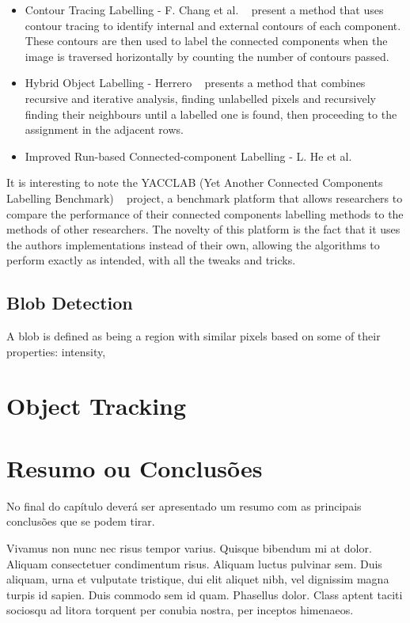 \begin{itemize}
	\item Contour Tracing Labelling - F. Chang et al. ~\cite{chang_linear-time_2004} present a method that uses contour tracing to identify internal and external contours of each component. These contours are then used to label the connected components when the image is traversed horizontally by counting the number of contours passed.
	\item Hybrid Object Labelling - Herrero ~\cite{martin-herrero_hybrid_2007} presents a method that combines recursive and iterative analysis, finding unlabelled pixels and recursively finding their neighbours until a labelled one is found, then proceeding to the assignment in the adjacent rows.
	\item Improved Run-based Connected-component Labelling - L. He et al. ~\cite{he_run-based_2010}
\end{itemize}


It is interesting to note the YACCLAB (Yet Another Connected Components Labelling Benchmark) ~\cite{grana_yacclab_2016} project, a benchmark platform that allows researchers to compare the performance of their connected components labelling methods to the methods of other researchers. The novelty of this platform is the fact that it uses the authors implementations instead of their own, allowing the algorithms to perform exactly as intended, with all the tweaks and tricks.

\subsection{Blob Detection}

A blob is defined as being a region with similar pixels based on some of their properties: intensity, 

\section{Object Tracking}



\section{Resumo ou Conclusões}

No final do capítulo deverá ser apresentado um resumo com as 
principais conclusões que se podem tirar. 

Vivamus non nunc nec risus tempor varius. Quisque bibendum mi at
dolor. Aliquam consectetuer condimentum risus. Aliquam luctus pulvinar
sem. Duis aliquam, urna et vulputate tristique, dui elit aliquet nibh,
vel dignissim magna turpis id sapien. Duis commodo sem id
quam. Phasellus dolor. Class aptent taciti sociosqu ad litora torquent
per conubia nostra, per inceptos himenaeos. 
